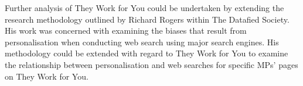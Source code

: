 Further analysis of They Work for You could be undertaken by extending the research methodology outlined by Richard Rogers within The Datafied Society. His work was concerned with examining the biases that result from personalisation when conducting web search using major search engines. His methodology could be extended with regard to They Work for You to examine the relationship between personalisation and web searches for specific MPs’ pages on They Work for You.  